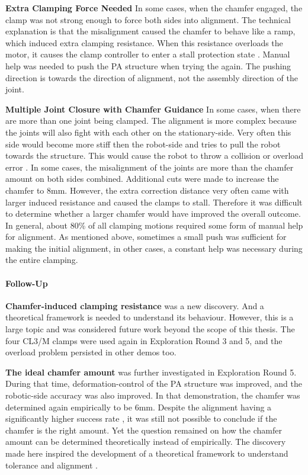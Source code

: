 \textbf{Extra Clamping Force Needed} In some cases, when the chamfer engaged, the clamp was not strong enough to force both sides into alignment. The technical explanation is that the misalignment caused the chamfer to behave like a ramp, which induced extra clamping resistance. When this resistance overloads the motor, it causes the clamp controller to enter a stall protection state . Manual help was needed to push the PA structure when trying the  again. The pushing direction is towards the direction of alignment, not the assembly direction of the joint.

\textbf{Multiple Joint Closure with Chamfer Guidance} In some cases, when there are more than one joint being clamped. The alignment is more complex because the joints will also fight with each other on the stationary-side. Very often this side would become more stiff then the robot-side and tries to pull the robot towards the structure. This would cause the robot to throw a collision or overload error .
In some cases, the misalignment of the joints are more than the chamfer amount on both sides combined. Additional cuts were made to increase the chamfer to 8mm. However, the extra correction distance very often came with larger induced resistance and caused the clamps to stall. Therefore it was difficult to determine whether a larger chamfer would have improved the overall outcome. 
In general, about 80\% of all clamping motions required some form of manual help for alignment. As mentioned above, sometimes a small push was sufficient for making the initial alignment, in other cases, a constant help was necessary during the entire clamping.

\paragraph{Follow-Up}

\textbf{Chamfer-induced clamping resistance} was a new discovery. And a theoretical framework is needed to understand its behaviour. However, this is a large topic and was considered future work beyond the scope of this thesis. The four CL3/M clamps were used again in Exploration Round 3 and 5, and the overload problem persisted in other demos too. 

\textbf{The ideal chamfer amount} was further investigated in Exploration Round 5. During that time, deformation-control of the PA structure was improved, and the robotic-side accuracy was also improved. In that demonstration, the chamfer was determined again empirically to be 6mm. Despite the alignment having a significantly higher success rate , it was still not possible to conclude if the chamfer is the right amount.
Yet the question remained on how the chamfer amount can be determined theoretically instead of empirically. The discovery made here inspired the development of a theoretical framework to understand tolerance and alignment .

